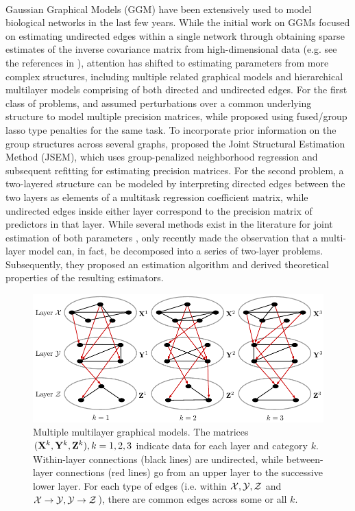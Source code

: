 \paragraph{}
Gaussian Graphical Models (GGM) have been extensively used to model biological networks in the last few years. While the initial work on GGMs focused on estimating undirected edges within a single network through obtaining sparse estimates of the inverse covariance matrix from high-dimensional data (e.g. see the references in \cite{BuhlmannvandeGeer11}), attention has shifted to estimating parameters from more complex structures, including multiple related graphical models and hierarchical multilayer models comprising of both directed and undirected edges. For the first class of problems, \cite{GuoEtal11} and \cite{XieLiuValdar16} assumed perturbations over a common underlying structure to model multiple precision matrices, while \cite{DanaherEtal14} proposed using fused/group lasso type penalties for the same task. To incorporate prior information on the group structures across several graphs, \cite{MaMichailidis15} proposed the Joint Structural Estimation Method (JSEM), which uses group-penalized neighborhood regression and subsequent refitting for estimating precision matrices.
For the second problem, a two-layered structure can be modeled by interpreting directed edges between the two layers as elements of a multitask regression coefficient matrix, while undirected edges inside either layer correspond to the precision matrix of predictors in that layer. While several methods exist in the literature for joint estimation of both parameters \citep{LeeLiu12, CaiEtal12}, only recently \cite{LinEtal16} made the observation that a multi-layer model can, in fact, be decomposed into a series of two-layer problems. Subsequently, they proposed an estimation algorithm and derived theoretical properties of the resulting estimators.

\begin{figure}
\centering
\includegraphics[]{multi2layer}
\caption{Multiple multilayer graphical models. The matrices $({\mathbf{X}}^k, {\mathbf{Y}}^k, {\mathbf{Z}}^k), k = 1,2,3$ indicate data for each layer and category $k$. Within-layer connections (black lines) are undirected, while between-layer connections (red lines) go from an upper layer to the successive lower layer. For each type of edges (i.e. within ${\cal{X}}, {\cal{Y}}, {\cal{Z}}$ and ${\cal{X}} \rightarrow {\cal{Y}}, {\cal{Y}} \rightarrow {\cal{Z}}$), there are common edges across some or all $k$. }
\label{fig:multi2layer}
\end{figure}

